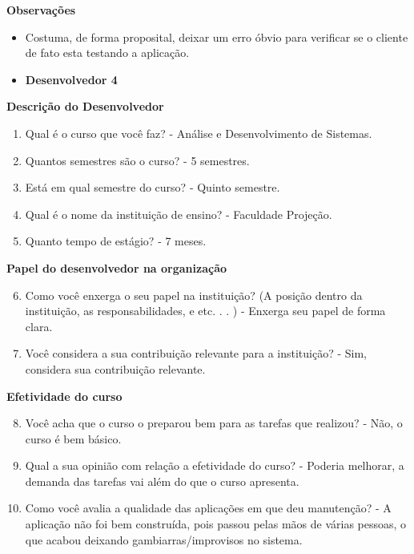 \begin{apendicesenv}
\textbf{Observações}
\begin{itemize}
	\item Costuma, de forma proposital, deixar um erro óbvio para verificar se o cliente de fato esta testando a aplicação.
\end{itemize}


\begin{itemize}
	\item \textbf{Desenvolvedor 4}
\end{itemize}

\textbf{Descrição do Desenvolvedor}

\begin{enumerate}
	\item Qual é o curso que você faz?\newline
	- Análise e Desenvolvimento de Sistemas.
	\item Quantos semestres são o curso?\newline
	- 5 semestres.
	\item Está em qual semestre do curso?\newline
	- Quinto semestre.
	\item Qual é o nome da instituição de ensino?\newline
	- Faculdade Projeção.
	\item Quanto tempo de estágio?\newline
	- 7 meses.
\end{enumerate}

\textbf{Papel do desenvolvedor na organização}

\begin{enumerate}
	\setcounter{enumi}{5}
	\item Como você enxerga o seu papel na instituição? (A posição dentro da instituição, as
	responsabilidades, e etc. . . )\newline
	- Enxerga seu papel de forma clara.
	\item Você considera a sua contribuição relevante para a instituição?\newline
	- Sim, considera sua contribuição relevante.
\end{enumerate}

\textbf{Efetividade do curso}

\begin{enumerate}
	\setcounter{enumi}{7}
	\item Você acha que o curso o preparou bem para as tarefas que realizou?\newline
	- Não, o curso é bem básico.
	\item Qual a sua opinião com relação a efetividade do curso?\newline
	- Poderia melhorar, a demanda das tarefas vai além do que o curso apresenta.
	\item Como você avalia a qualidade das aplicações em que deu manutenção?\newline
	- A aplicação não foi bem construída, pois passou pelas mãos de várias pessoas, o que acabou deixando gambiarras/improvisos no sistema.
\end{enumerate}


\end{apendicesenv}
